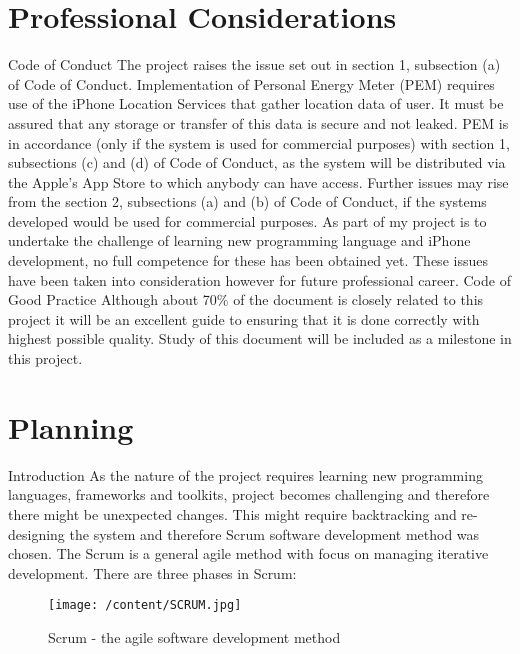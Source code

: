 \documentclass[12pt, a4paper]{report}   %
\begin{document}
\chapter{Professional Considerations}
Code of Conduct
The project raises the issue set out in section 1, subsection (a) of Code of Conduct. Implementation of Personal Energy Meter (PEM) requires use of the iPhone Location Services that gather location data of user. It must be assured that any storage or transfer of this data is secure and not leaked.
PEM is in accordance (only if the system is used for commercial purposes) with section 1, subsections (c) and (d) of Code of Conduct, as the system will be distributed via the Apple's App Store to which anybody can have access.
Further issues may rise from the section 2, subsections (a) and (b) of Code of Conduct, if the systems developed would be used for commercial purposes. As part of my project is to undertake the challenge of learning new programming language and iPhone development, no full competence for these has been obtained yet. These issues have been taken into consideration however for future professional career.
Code of Good Practice
Although about 70\% of the document is closely related to this project it will be an excellent guide to ensuring that it is done correctly with highest possible quality.
Study of this document will be included as a milestone in this project.


\chapter{Planning}
Introduction
As the nature of the project requires learning new programming languages, frameworks and toolkits, project becomes challenging and therefore there might be unexpected changes. This might require backtracking and re-designing the system and therefore Scrum software development method was chosen. The Scrum is a general agile method with focus on managing iterative development. There are three phases in Scrum:\\

\begin{figure}[H]
  \centering
	\texttt{[image: /content/SCRUM.jpg]}\\
	  \caption{Scrum - the agile software development method}
\end{figure}
\end{document}
